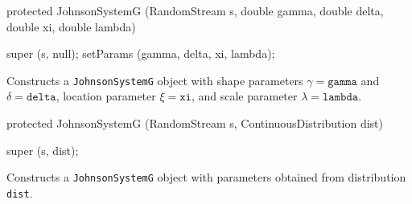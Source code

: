 \begin{code}

   protected JohnsonSystemG (RandomStream s, double gamma, double delta,
                             double xi, double lambda)\begin{hide} {
      super (s, null);
      setParams (gamma, delta, xi, lambda);
   }\end{hide}
\end{code}
\begin{tabb} Constructs a \texttt{JohnsonSystemG} object
   with shape parameters $\gamma = \texttt{gamma}$ and $\delta = \texttt{delta}$,
   location parameter $\xi = \texttt{xi}$, and scale parameter
   $\lambda = \texttt{lambda}$.
\end{tabb}
\begin{code}

   protected JohnsonSystemG (RandomStream s, ContinuousDistribution dist)\begin{hide} {
      super (s, dist);
   }\end{hide}
\end{code}
\begin{tabb} Constructs a \texttt{JohnsonSystemG} object with parameters
   obtained from distribution \texttt{dist}.
\end{tabb}


